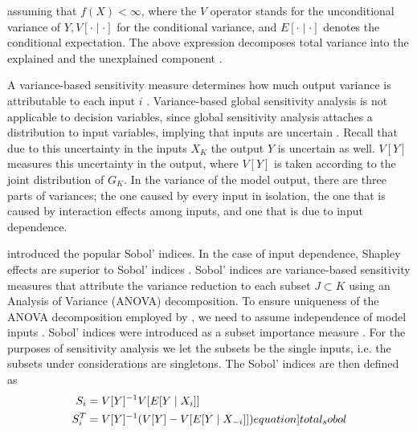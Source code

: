 \noindent assuming that $f(X) < \infty$, where the $V$ operator stands for the unconditional variance of $Y, V[\cdot \mid \cdot]$ for the conditional variance, and $E[\cdot \mid \cdot]$ denotes the conditional expectation. The above expression decomposes total variance into the explained and the unexplained component \citep{GM17}.

A variance-based sensitivity measure determines how much output variance is attributable to each input $i$ \citep{BP16}. Variance-based global sensitivity analysis is not applicable to decision variables, since global sensitivity analysis attaches a distribution to input variables, implying that inputs are uncertain \citep{SNS16}. Recall that due to this uncertainty in the inputs $X_K$ the output $Y$ is uncertain as well. $V[Y]$ measures this uncertainty in the output, where $V[Y]$ is taken according to the joint distribution of $G_K$. In the variance of the model output, there are three parts of variances; the one caused by every input in isolation, the one that is caused by interaction effects among inputs, and one that is due to input dependence.

\citet{S93} introduced the popular Sobol' indices. In the case of input dependence, Shapley effects are superior to Sobol' indices \citep{O14}. Sobol' indices are variance-based sensitivity measures that attribute the variance reduction to each subset $J \subset K$ using an Analysis of Variance (ANOVA) decomposition. To ensure uniqueness of the ANOVA decomposition employed by \citet{S53}, we need to assume independence of model inputs \citep{GM17}. Sobol' indices were introduced as a subset importance measure \citep{SNS16}. For the purposes of sensitivity analysis we let the subsets be the single inputs, i.e. the subsets under considerations are singletons. The Sobol' indices are then defined as
\begin{align}
S_i &= V[Y]^{-1} V[E[Y \mid X_i]]\\
S_i^T &= V[Y]^{-1}(V[Y] - V[E[Y \mid {X_{- i}}]])
\label[equation]{total_sobol}
\end{align}

